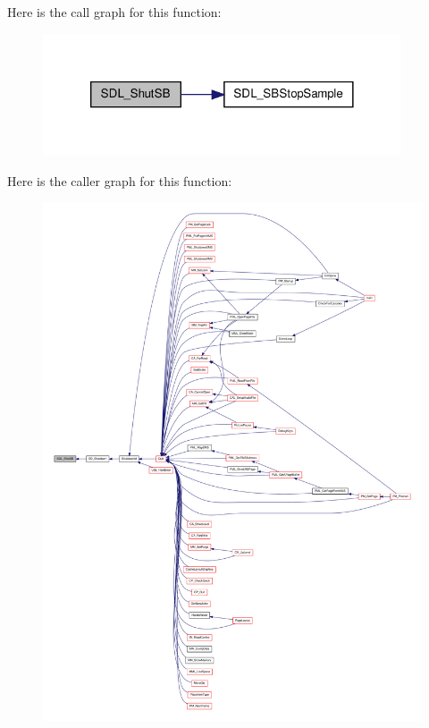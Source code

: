 Here is the call graph for this function:
\nopagebreak
\begin{figure}[H]
\begin{center}
\leavevmode
\includegraphics[width=300pt]{ID__SD_8C_ae4b2df23a45a69c1fc95b28f90b16161_cgraph}
\end{center}
\end{figure}




Here is the caller graph for this function:
\nopagebreak
\begin{figure}[H]
\begin{center}
\leavevmode
\includegraphics[width=400pt]{ID__SD_8C_ae4b2df23a45a69c1fc95b28f90b16161_icgraph}
\end{center}
\end{figure}


